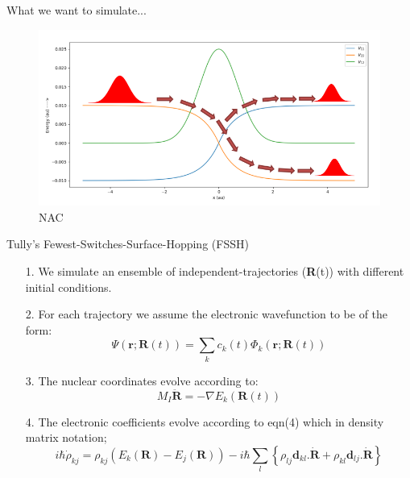 \documentclass{beamer}
\begin{document}
	\begin{frame}[t]{What we want to simulate...}
	\begin{figure}
	\includegraphics[scale=0.55]{FSSH_goal.png}
	\caption{NAC}
	\end{figure}
	\end{frame}
	

	\begin{frame}[t]{Tully's Fewest-Switches-Surface-Hopping (FSSH)}
	\begin{enumerate}
	\item[1.]{We simulate an ensemble of independent-trajectories (\textbf{R}(t)) with different initial conditions.}
	\item[2.]{For each trajectory we assume the electronic wavefunction to be of the form:
	\begin{equation}
	\Psi(\textbf{r};\textbf{R}(t)) = \sum_kc_k(t)\Phi_k(\textbf{r};\textbf{R}(t))
	\end{equation}}
	\item[3.]{The nuclear coordinates evolve according to:
	\begin{equation}
	M_I\ddot{\textbf{R}} = -\nabla E_k(\textbf{R}(t))
	\end{equation}}
	\item[4.]{The electronic coefficients evolve according to eqn(4) which in density matrix notation;
	\begin{equation}
	i\hbar\dot{\rho}_{kj} = \rho_{kj}(E_k(\textbf{R})-E_j(\textbf{R})) - i\hbar \sum_l\left\lbrace\rho_{lj}\textbf{d}_{kl}\textbf{.}\dot{\textbf{R}} + \rho_{kl}\textbf{d}_{lj}\textbf{.}\dot{\textbf{R}}\right\rbrace
	\end{equation}}
	\end{enumerate}
	\end{frame}
	
\end{document}
